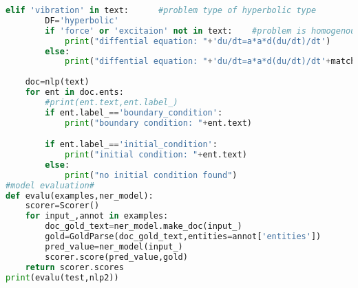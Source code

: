 \begin{lstlisting}[language=python]
    elif 'vibration' in text:      #problem type of hyperbolic type
        DF='hyperbolic'
        if 'force' or 'excitaion' not in text:    #problem is homogenous
            print("diffential equation: "+'du/dt=a*a*d(du/dt)/dt')
        else:
            print("diffential equation: "+'du/dt=a*a*d(du/dt)/dt'+match[0])
          
    doc=nlp(text)
    for ent in doc.ents:
        #print(ent.text,ent.label_)
        if ent.label_=='boundary_condition':
            print("boundary condition: "+ent.text)

        if ent.label_=='initial_condition':    
            print("initial condition: "+ent.text)
        else:
            print("no initial condition found")
#model evaluation#
def evalu(examples,ner_model):
    scorer=Scorer()
    for input_,annot in examples:
        doc_gold_text=ner_model.make_doc(input_)
        gold=GoldParse(doc_gold_text,entities=annot['entities'])
        pred_value=ner_model(input_)
        scorer.score(pred_value,gold)
    return scorer.scores
print(evalu(test,nlp2))
\end{lstlisting}